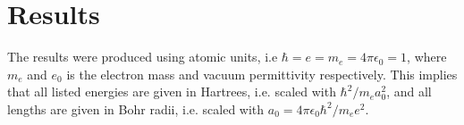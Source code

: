 \chapter{Results}

The results were produced using atomic units, i.e $\hbar=e=m_e=4\pi\epsilon_0 = 1$, where $m_e$ and $e_0$ is the electron mass and vacuum permittivity respectively. This implies that all listed energies are given in Hartrees, i.e. scaled with $\hbar^2/m_ea_0^2$, and all lengths are given in Bohr radii, i.e. scaled with $a_0=4\pi\epsilon_0\hbar^2/m_e e^2$.



\clearpage

\clearpage

\clearpage

\clearpage






 
 

 
 
 



